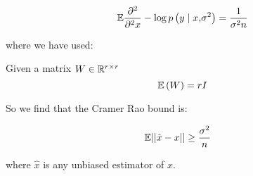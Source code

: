 \documentclass[12pt, a4paper, titlepage]{article}
\begin{document}
\begin{equation}
{\mathbb{E}}{\frac{\partial^2}{\partial^2x} -\log{p \left(y \mid x \text{,} \sigma^2 \right) }} = \frac{1}{\sigma^2 n}
\end{equation}

where we have used:

\begin{theorem}\label{thm:wishart-mean}
Given a matrix  \(W \in {\mathbb{R}}^{r \times r}\)
\begin{equation}
{\mathbb{E}}\left(W\right) = rI
\end{equation}
\end{theorem}

So we find that the Cramer Rao bound is:

\begin{align}
{\mathbb{E}}{\left|\left|\hat{x}-x\right|\right|} &\geq \frac{\sigma^2}{n}
\end{align}

where \(\hat{x}\) is any unbiased estimator of \(x\).
\end{document}
